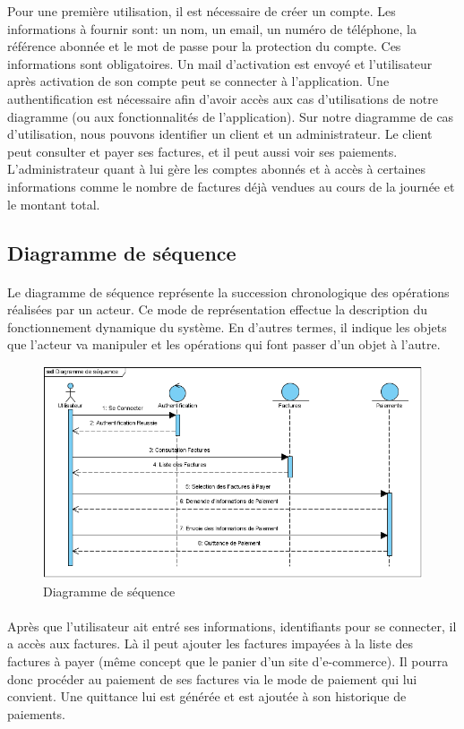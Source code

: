 	  Pour une premi\`ere utilisation, il est n\'ecessaire de cr\'eer un compte. Les informations \`a fournir sont: un nom, un email, un num\'ero de t\'el\'ephone, la r\'ef\'erence abonn\'ee et le mot de passe pour la protection du compte. Ces informations sont obligatoires. Un mail d'activation est envoy\'e et l'utilisateur apr\`es activation de son compte peut se connecter \`a l'application. Une authentification est nécessaire afin d'avoir acc\`es aux cas d'utilisations de notre diagramme (ou aux fonctionnalités de l'application). Sur notre diagramme de cas d'utilisation, nous pouvons identifier un client et un administrateur. Le client peut consulter et payer ses factures, et il peut aussi voir ses paiements. L'administrateur quant \`a lui g\`ere les comptes abonn\'es et \`a acc\`es \`a certaines informations comme le nombre de factures d\'ej\`a vendues au cours de la journ\'ee et le montant total.
	  
\subsection{Diagramme de séquence}
 \paragraph{}
	  Le diagramme de séquence représente la succession chronologique des opérations réalisées par un acteur. Ce mode de représentation effectue la description du fonctionnement dynamique du système. En d'autres termes, il indique les objets que l'acteur va manipuler et les opérations qui font passer d'un objet à l'autre.
	  \begin{figure}[H]
		     \begin{center}
			\includegraphics[scale=0.6]{images/sd.png}
		     \end{center}
		     \caption{Diagramme de séquence}
		     \label{Diagramme de cas d'utilisation}
	  \end{figure}
	  \paragraph{}
	  Après que l'utilisateur ait entré ses informations, identifiants pour se connecter, il a acc\`es aux factures. L\`a il peut ajouter les factures impay\'ees \`a la liste des factures \`a payer (m\^eme concept que le panier d'un site d'e-commerce). Il pourra donc proc\'eder au paiement de ses factures via le mode de paiement qui lui convient. Une quittance lui est g\'en\'er\'ee et est ajout\'ee \`a son historique de paiements.